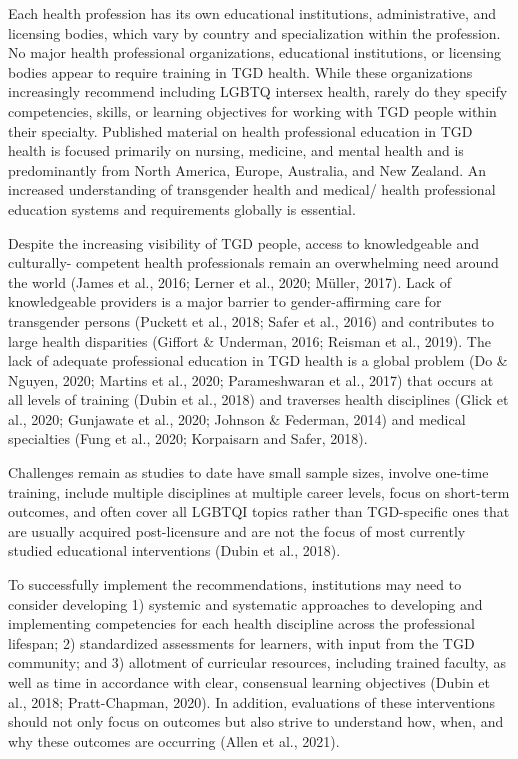\documentclass[
]{book}
\begin{document}
Each health profession has its own educational
institutions, administrative, and licensing bodies,
which vary by country and specialization within
the profession. No major health professional organizations, educational institutions, or licensing
bodies appear to require training in TGD health.
While these organizations increasingly recommend including LGBTQ intersex health, rarely
do they specify competencies, skills, or learning
objectives for working with TGD people within
their specialty. Published material on health professional education in TGD health is focused
primarily on nursing, medicine, and mental
health and is predominantly from North America,
Europe, Australia, and New Zealand. An increased
understanding of transgender health and medical/
health professional education systems and requirements globally is essential.

Despite the increasing visibility of TGD people,
access to knowledgeable and culturally- competent health professionals remain an overwhelming
need around the world (James et al., 2016; Lerner
et al., 2020; Müller, 2017). Lack of knowledgeable
providers is a major barrier to gender-affirming
care for transgender persons (Puckett et al., 2018;
Safer et al., 2016) and contributes to large health
disparities (Giffort \& Underman, 2016; Reisman
et al., 2019). The lack of adequate professional
education in TGD health is a global problem (Do
\& Nguyen, 2020; Martins et al., 2020;
Parameshwaran et al., 2017) that occurs at all
levels of training (Dubin et al., 2018) and traverses health disciplines (Glick et al., 2020;
Gunjawate et al., 2020; Johnson \& Federman,
2014) and medical specialties (Fung et al., 2020;
Korpaisarn and Safer, 2018).

Challenges remain as studies to date have
small sample sizes, involve one-time training,
include multiple disciplines at multiple career
levels, focus on short-term outcomes, and often
cover all LGBTQI topics rather than
TGD-specific ones that are usually acquired
post-licensure and are not the focus of most
currently studied educational interventions
(Dubin et al., 2018).

To successfully implement the recommendations, institutions may need to consider
developing 1) systemic and systematic approaches
to developing and implementing competencies
for each health discipline across the professional
lifespan; 2) standardized assessments for learners,
with input from the TGD community; and 3)
allotment of curricular resources, including
trained faculty, as well as time in accordance with
clear, consensual learning objectives (Dubin et al.,
2018; Pratt-Chapman, 2020). In addition, evaluations of these interventions should not only
focus on outcomes but also strive to understand
how, when, and why these outcomes are occurring (Allen et al., 2021).
\end{document}
